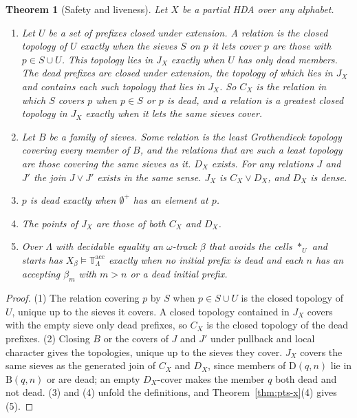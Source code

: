 \documentclass{lmcs}
\newtheorem{theorem}{Theorem}[section]
\theoremstyle{definition}
\theoremstyle{remark}
\newcommand{\Tt}{\mathbb{T}}
\newcommand{\JX}[1]{J_{#1}}
\newcommand{\BB}{\mathrm{B}}
\providecommand{\Tacc}{\Tt^{\mathrm{acc}}_{\Lambda}}
\begin{document}
\begin{theorem}[Safety and liveness]\label{thm:setup-safety}
Let $X$ be a partial HDA over any alphabet.
\begin{enumerate}
\item Let $U$ be a set of prefixes closed under extension. A relation is the closed topology of $U$ exactly when
  the sieves $S$ on $p$ it lets cover $p$ are those with $p\in S\cup U$. This topology lies in $\JX{X}$
  exactly when $U$ has only dead members. The dead prefixes are closed under
  extension, the topology of which lies in $\JX{X}$ and
  contains each such topology that lies in $\JX{X}$. So $C_X$ is the relation in which
  $S$ covers $p$ when $p\in S$ or $p$ is dead, and a relation
  is a greatest closed topology in $\JX{X}$ exactly when it lets the same sieves cover.
\item Let $B$ be a family of sieves. Some relation is the least Grothendieck topology covering every member of $B$,
  and the relations that are such a least topology are those covering the same sieves as
  it. $D_X$ exists. For any relations $J$
  and $J'$ the join $J\vee J'$ exists in the same sense. $\JX{X}$ is
  $C_X\vee D_X$, and $D_X$ is dense.
\item $p$ is dead exactly when $\emptyset^{+}$ has an element at $p$.
\item The points of $\JX{X}$ are those of both $C_X$ and $D_X$.
\item Over $\Lambda$ with decidable equality an $\omega$-track $\beta$ that avoids the cells $\ast_U$ and starts
  has $X_\beta\models\Tacc$ exactly when no initial prefix is dead and each $n$ has an accepting $\beta_m$ with $m>n$
  or a dead initial prefix.
\end{enumerate}
\end{theorem}

\begin{proof}
(1) The relation covering $p$ by $S$ when $p\in S\cup U$ is the closed topology of $U$,
unique up to the sieves it covers. A closed topology contained in $\JX{X}$ covers with the empty
sieve only dead prefixes, so
$C_X$ is the closed topology of the dead prefixes.
(2) Closing $B$ or the covers of $J$ and $J'$ under pullback and local character gives the
topologies, unique up to the sieves they cover.
$\JX{X}$ covers the same sieves as the generated join of $C_X$ and $D_X$, since members of $\mathrm{D}(q,n)$ lie in $\BB(q,n)$ or are
dead; an empty
$D_X$-cover makes the member $q$ both dead and not dead. (3) and (4) unfold the
definitions, and Theorem~\ref{thm:pts-x}(4) gives
(5).
\end{proof}
\end{document}
